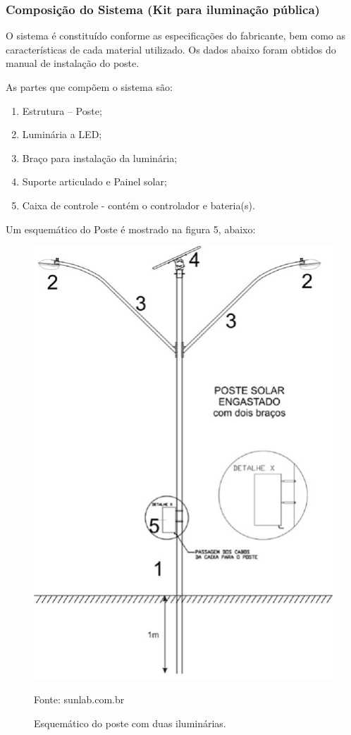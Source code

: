 \subsubsection{Composição do Sistema (Kit para iluminação pública)}

	O sistema é  constituído conforme as especificações do fabricante, bem como as características de cada material utilizado. Os dados abaixo foram obtidos do manual de instalação do poste.
	
	As partes que compõem o sistema são:

\begin{enumerate}
	\item Estrutura – Poste; 
	\item Luminária a LED; 
	\item Braço para instalação da luminária; 
	\item Suporte articulado e Painel solar; 
	\item Caixa de controle - contém o controlador e bateria(s).
\end{enumerate}

	Um esquemático do Poste é mostrado na figura 5, abaixo:
	
\begin{figure}[H]
	 \centering
	\label{Esquemático do poste com duas iluminárias}
	 \includegraphics[keepaspectratio=true,scale=0.8]{postes/6.png}
	 \caption{Esquemático do poste com duas iluminárias.}
	 \small{Fonte: sunlab.com.br}
\end{figure}	
	
